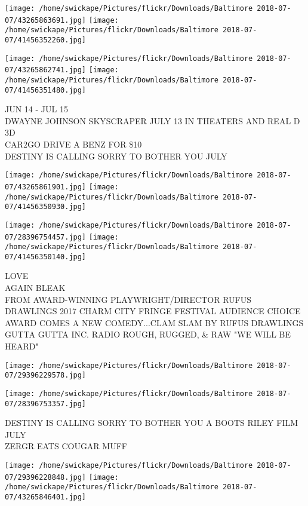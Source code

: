 \documentclass[10pt,letterpaper]{article}
\begin{document}
\texttt{[image: /home/swickape/Pictures/flickr/Downloads/Baltimore 2018-07-07/43265863691.jpg]}
\texttt{[image: /home/swickape/Pictures/flickr/Downloads/Baltimore 2018-07-07/41456352260.jpg]}

\texttt{[image: /home/swickape/Pictures/flickr/Downloads/Baltimore 2018-07-07/43265862741.jpg]}
\texttt{[image: /home/swickape/Pictures/flickr/Downloads/Baltimore 2018-07-07/41456351480.jpg]}

JUN 14 {-} JUL 15\\
DWAYNE JOHNSON SKYSCRAPER JULY 13 IN THEATERS AND REAL D 3D\\
CAR2GO DRIVE A BENZ FOR \$10\\
DESTINY IS CALLING SORRY TO BOTHER YOU JULY
\pagebreak

\texttt{[image: /home/swickape/Pictures/flickr/Downloads/Baltimore 2018-07-07/43265861901.jpg]}
\texttt{[image: /home/swickape/Pictures/flickr/Downloads/Baltimore 2018-07-07/41456350930.jpg]}

\texttt{[image: /home/swickape/Pictures/flickr/Downloads/Baltimore 2018-07-07/28396754457.jpg]}
\texttt{[image: /home/swickape/Pictures/flickr/Downloads/Baltimore 2018-07-07/41456350140.jpg]}

LOVE\\
AGAIN BLEAK\\
FROM AWARD{-}WINNING PLAYWRIGHT/DIRECTOR RUFUS DRAWLINGS 2017 CHARM CITY FRINGE FESTIVAL AUDIENCE CHOICE AWARD COMES A NEW COMEDY...CLAM SLAM BY RUFUS DRAWLINGS\\
GUTTA GUTTA INC. RADIO ROUGH, RUGGED, \& RAW "WE WILL BE HEARD"
\pagebreak

\texttt{[image: /home/swickape/Pictures/flickr/Downloads/Baltimore 2018-07-07/29396229578.jpg]}

\vspace{0.25in}
\texttt{[image: /home/swickape/Pictures/flickr/Downloads/Baltimore 2018-07-07/28396753357.jpg]}

DESTINY IS CALLING SORRY TO BOTHER YOU A BOOTS RILEY FILM JULY\\
ZERGR EATS COUGAR MUFF
\pagebreak

\texttt{[image: /home/swickape/Pictures/flickr/Downloads/Baltimore 2018-07-07/29396228848.jpg]}
\texttt{[image: /home/swickape/Pictures/flickr/Downloads/Baltimore 2018-07-07/43265846401.jpg]}
\end{document}

